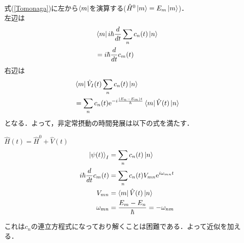 \documentclass{standalone}
\begin{document}
  式(\ref{Tomonaga})に左から$\bra{m}$を演算する($\hat{H}^0\ket{m}=E_m\ket{m}$)．\\
  左辺は
  \begin{align}
    &\bra{m}i\hbar\frac{d}{dt}\sum_nc_n(t)\ket{n}\\
    &=i\hbar\frac{d}{dt}c_m(t)
  \end{align}
  右辺は
  \begin{align}
    &\bra{m}\hat{V}_I(t)\sum_{n}c_n(t)\ket{n}\\
    &=\sum_{n}c_n(t)\mathrm{e}^{-i\frac{(E_n-E_m)t}{\hbar}}\bra{m}\hat{V}(t)\ket{n}
  \end{align}
  となる．よって，非定常摂動の時間発展は以下の式を満たす．
  \begin{itembox}[l]{$\hat{H}(t)=\hat{H}^0+\hat{V}(t)$}
    \begin{align}
      \ket{\psi(t)}_I&=\sum_{n}c_n(t)\ket{n}\\
      i\hbar\frac{d}{dt}c_m(t)&=\sum_{n}c_n(t)V_{mn}\mathrm{e}^{i\omega_{mn}t}\\
      V_{mn}&=\bra{m}\hat{V}(t)\ket{n}\\
      \omega_{mn}&=\frac{E_m-E_n}{\hbar}=-\omega_{nm}
    \end{align}
  \end{itembox}
  これは$c_n$の連立方程式になっており解くことは困難である．よって近似を加える．
\end{document}
